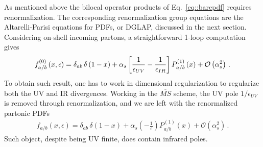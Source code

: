 %
As mentioned above the bilocal operator products of Eq.~\eqref{eq::barepdf} requires renormalization.
The corresponding renormalization group equations are the Altarelli-Parisi equations for PDFs, or 
DGLAP, discussed in the next section.
Considering on-shell incoming partons, a straightforward 1-loop computation gives
\begin{align}
    \label{eq:1-loop_bare_partonic_pdf}
    f^{{(0)}}_{a/b}\left(x,\epsilon\right) = \delta_{ab}\,\delta\left(1-x\right)
    + \alpha_s\left[\frac{1}{\epsilon_{UV}}-\frac{1}{\epsilon_{IR}}\right] P_{a/b}^{(1)}\left(x\right)
    + \mathcal{O}\left(\alpha_s^2\right)\,.
\end{align}
To obtain such result, one has to work in dimensional regularization to regularize both the UV and IR
divergences. 
Working in the $\overline{MS}$ scheme, the UV pole $1/\epsilon_{UV}$ is removed through renormalization,
and we are left with the renormalized partonic PDFs
\begin{align}
    \label{eq:1-loop_renormalized_partonic_pdf}
    f_{a/b}\left(x,\epsilon\right) = \delta_{ab}\,\delta\left(1-x\right)
    + \alpha_s\left(-\frac{1}{\epsilon}\right) P_{a/b}^{(1)}\left(x\right)
    + \mathcal{O}\left(\alpha_s^2\right)\,.
\end{align}
Such object, despite being UV finite, does contain 
infrared poles.

